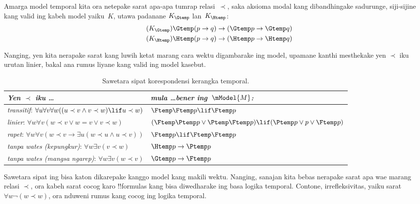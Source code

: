 \documentclass[../../../include/open-logic-section]{subfiles}
\begin{document}


Amarga model temporal kita ora netepake sarat apa-apa tumrap
relasi~$\prec$, saka aksioma modal kang dibandhingake sadurunge, siji-sijine kang valid ing
kabeh model yaiku~$K$, utawa padanane $K_{\Gtemp}$ lan~$K_{\Htemp}$:
\begin{align*}
\tag{$K_{\Gtemp}$}  \Gtemp (p \to q) & \to (\Gtemp p \to \Gtemp q)\\
\tag{$K_{\Htemp}$}  \Htemp (p \to q) & \to (\Htemp p \to \Htemp q)
\end{align*}

Nanging, yen kita nerapake sarat kang luwih ketat marang cara wektu
digambarake ing model, upamane kanthi mesthekake yen $\prec$ iku
urutan linier, bakal ana rumus liyane kang valid ing model kasebut.

\begin{table}[t]
  \begin{tabular}{| p{} || p{} |}
    \hline
    {\emph{Yen $\prec$ iku \dots}} & {\emph{mula \dots bener ing~$\mModel{M}$:}} \\
    \hline \hline
    \emph{transitif}: \newline
    $\forall u \forall v \forall w ((u \prec v \land v \prec w) \lif u \prec w)$ & 
    $\Ftemp \Ftemp p \lif \Ftemp p$  \\
    \hline 
    \emph{linier}: \newline
    $\forall w \forall v (w \prec v \lor w = v \lor v \prec w)$ &  
    $(\Ftemp \Ptemp  p \lor \Ptemp \Ftemp p) \lif (\Ptemp p \lor p \lor \Ftemp p)$\\
    \hline
    \emph{rapet}: \newline
    $\forall w \forall v (w \prec v \to \exists u(w \prec u \land u \prec v))$ &  
    $\Ftemp p \lif \Ftemp \Ftemp p$ \\
    \hline
    \emph{tanpa wates (kepungkur)}: \newline
    $\forall w \exists v( v \prec w)$ &  
    $\Htemp p \to \Ptemp p$ \\
    \hline
    \emph{tanpa wates (mangsa ngarep)}: \newline
    $\forall w \exists v( w \prec v)$ &  
    $\Gtemp p \to \Ftemp p$ \\
    \hline
  \end{tabular}
  \caption{Sawetara sipat korespondensi kerangka temporal.}
\end{table} 

Sawetara sipat ing  bisa katon dikarepake
kanggo model kang makili wektu. Nanging, sanajan kita bebas nerapake
sarat apa wae marang relasi $\prec$, ora kabeh sarat cocog karo
!!{formula}s kang bisa diwedharake ing basa logika temporal.
Contone, irrefleksivitas, yaiku sarat
$\forall w \lnot (w \prec w)$, ora nduweni rumus kang cocog ing
logika temporal.
\end{document}

